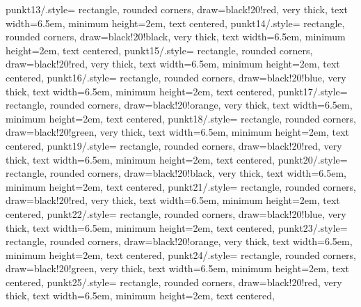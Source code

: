 \documentclass[10pt]{standalone}
\begin{document}
{    punkt13/.style={
           rectangle,
           rounded corners,
           draw=black!20!red, very thick,
           text width=6.5em,
           minimum height=2em,
           text centered},
    punkt14/.style={
           rectangle,
           rounded corners,
           draw=black!20!black, very thick,
           text width=6.5em,
           minimum height=2em,
           text centered},
    punkt15/.style={
           rectangle,
           rounded corners,
           draw=black!20!red, very thick,
           text width=6.5em,
           minimum height=2em,
           text centered},
    punkt16/.style={
           rectangle,
           rounded corners,
           draw=black!20!blue, very thick,
           text width=6.5em,
           minimum height=2em,
           text centered},
    punkt17/.style={
           rectangle,
           rounded corners,
           draw=black!20!orange, very thick,
           text width=6.5em,
           minimum height=2em,
           text centered},
    punkt18/.style={
           rectangle,
           rounded corners,
           draw=black!20!green, very thick,
           text width=6.5em,
           minimum height=2em,
           text centered},
    punkt19/.style={
           rectangle,
           rounded corners,
           draw=black!20!red, very thick,
           text width=6.5em,
           minimum height=2em,
           text centered},
    punkt20/.style={
           rectangle,
           rounded corners,
           draw=black!20!black, very thick,
           text width=6.5em,
           minimum height=2em,
           text centered},
    punkt21/.style={
           rectangle,
           rounded corners,
           draw=black!20!red, very thick,
           text width=6.5em,
           minimum height=2em,
           text centered},
    punkt22/.style={
           rectangle,
           rounded corners,
           draw=black!20!blue, very thick,
           text width=6.5em,
           minimum height=2em,
           text centered},
    punkt23/.style={
           rectangle,
           rounded corners,
           draw=black!20!orange, very thick,
           text width=6.5em,
           minimum height=2em,
           text centered},
    punkt24/.style={
           rectangle,
           rounded corners,
           draw=black!20!green, very thick,
           text width=6.5em,
           minimum height=2em,
           text centered},
    punkt25/.style={
           rectangle,
           rounded corners,
           draw=black!20!red, very thick,
           text width=6.5em,
           minimum height=2em,
           text centered},
}
\end{document}
